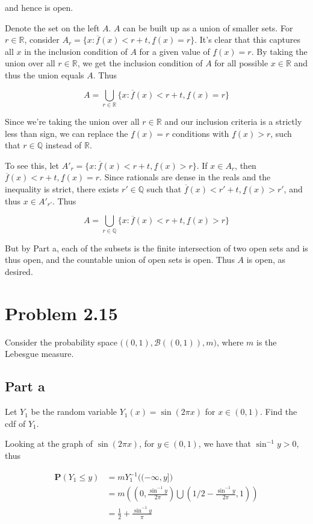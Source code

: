\documentclass{article}
\newcommand{\R}{\mathbb{R}}
\newcommand{\Q}{\mathbb{Q}}
\newcommand{\B}{\mathcal{B}}
\newcommand{\prob}{\boldsymbol{P}}
\begin{document}
and hence is open.

Denote the set on the left $A$. $A$ can be built up as a union of smaller sets. For $r \in \R$, consider $A_r = \{ x: \overline{f}(x)<r+t, \underline{f}(x) = r \}$. It's clear that this captures all $x$ in the inclusion condition of $A$ for a given value of $\underline{f}(x) = r$. By taking the union over all $r \in \R$, we get the inclusion condition of $A$ for all possible $x \in \R$ and thus the union equals $A$. Thus

\[
A = \bigcup_{r \in \R} \{ x: \overline{f}(x)<r+t, \underline{f}(x) = r \}
\] 

Since we're taking the union over all $r \in \R$ and our inclusion criteria is a strictly less than sign, we can replace the $\underline{f}(x) = r$ conditions with $\underline{f}(x) > r$, such that $r \in \Q$ instead of $\R$.

To see this, let $A'_{r} = \{ x: \overline{f}(x)<r+t, \underline{f}(x) > r \}$. If $x \in A_r$, then $\overline{f}(x) < r+t, \underline{f}(x) = r$. Since rationals are dense in the reals and the inequality is strict, there exists $r' \in \Q$ such that $\overline{f}(x)<r'+t, \underline{f}(x) > r'$, and thus $x \in A'_{r'}$. Thus

\[
A = \bigcup_{r \in \Q} \{ x: \overline{f}(x)<r+t, \underline{f}(x) > r \}
\]

But by Part a, each of the subsets is the finite intersection of two open sets and is thus open, and the countable union of open sets is open. Thus $A$ is open, as desired.

\section*{Problem 2.15}

Consider the probability space $\bigl((0, 1), \B((0, 1)), m \bigl)$, where $m$ is the Lebesgue measure.

\subsection*{Part a}

Let $Y_1$ be the random variable $Y_1(x) = \sin(2\pi x)$ for $x \in (0, 1)$. Find the cdf of $Y_1$.

Looking at the graph of $\sin(2\pi x)$, for $y \in (0, 1)$, we have that $\sin^{-1} y > 0$, thus

\begin{align*}
\prob(Y_1 \leq y) &= mY_1^{-1}\bigl( (-\infty, y] \bigr)\\
&= m\left( \left(0, \frac{\sin^{-1}y}{2\pi}\right) \bigcup \left(1/2 - \frac{\sin^{-1}y}{2\pi}, 1\right)  \right)\\
&= \frac{1}{2} + \frac{\sin^{-1}y}{\pi}
\end{align*}
\end{document}
